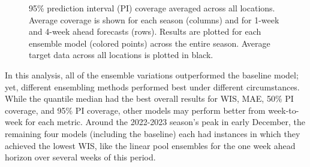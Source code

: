 \documentclass[
  article,
  shortnames,
  notitle]{jss}
\begin{document}
\begin{figure}


\caption{\label{fig-cov95-vs-forecast-date}95\% prediction interval (PI)
coverage averaged across all locations. Average coverage is shown for
each season (columns) and for 1-week and 4-week ahead forecasts (rows).
Results are plotted for each ensemble model (colored points) across the
entire season. Average target data across all locations is plotted in
black.}

\end{figure}%

In this analysis, all of the ensemble variations outperformed the
baseline model; yet, different ensembling methods performed best under
different circumstances. While the quantile median had the best overall
results for WIS, MAE, 50\% PI coverage, and 95\% PI coverage, other
models may perform better from week-to-week for each metric. Around the
2022-2023 season's peak in early December, the remaining four models
(including the baseline) each had instances in which they achieved the
lowest WIS, like the linear pool ensembles for the one week ahead
horizon over several weeks of this period.
\end{document}
